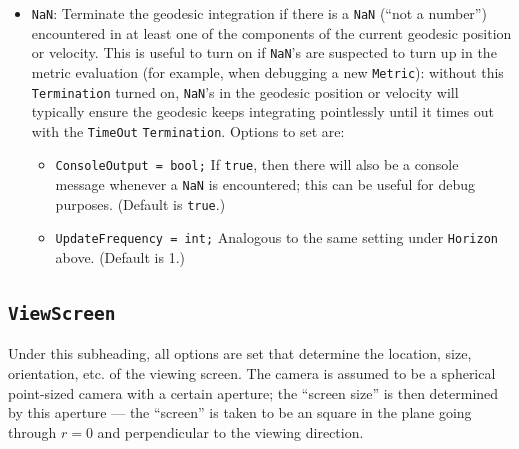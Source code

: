 \documentclass[11pt,a4paper]{article}
\newcommand{\code}[1]{{\tt #1}}
\begin{document}
\begin{itemize}
 \item \code{NaN}: Terminate the geodesic integration if there is a \code{NaN} (``not a number'') encountered in at least one of the components of the current geodesic position or velocity. This is useful to turn on if \code{NaN}'s are suspected to turn up in the metric evaluation (for example, when debugging a new \code{Metric}): without this \code{Termination} turned on, \code{NaN}'s in the geodesic position or velocity will typically ensure the geodesic keeps integrating pointlessly until it times out with the \code{TimeOut} \code{Termination}. Options to set are:
 \begin{itemize}
 \item \code{ConsoleOutput = bool;} \newline If \code{true}, then there will also be a console message whenever a \code{NaN} is encountered; this can be useful for debug purposes. (Default is \code{true}.)
  \item \code{UpdateFrequency = int;} \newline Analogous to the same setting under \code{Horizon} above. (Default is 1.)
 \end{itemize}
 
\end{itemize}


\subsection{\code{ViewScreen}}
Under this subheading, all options are set that determine the location, size, orientation, etc. of the viewing screen. The camera is assumed to be a spherical point-sized camera with a certain aperture; the ``screen size'' is then determined by this aperture --- the ``screen'' is taken to be an square in the plane going through $r=0$ and perpendicular to the viewing direction.
\end{document}
